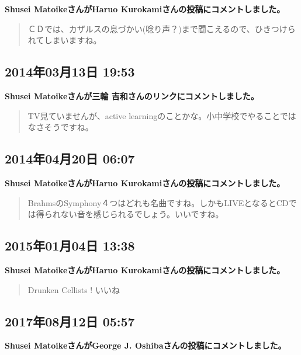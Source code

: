 \textbf{Shusei MatoikeさんがHaruo Kurokamiさんの投稿にコメントしました。}

\begin{quote}
ＣＤでは、カザルスの息づかい(唸り声？)まで聞こえるので、ひきつけられてしまいますね。
\end{quote}

\subsection*{2014年03月13日 19:53}

\textbf{Shusei Matoikeさんが三輪 吉和さんのリンクにコメントしました。}

\begin{quote}
TV見ていませんが、active learningのことかな。小中学校でやることではなさそうですね。
\end{quote}

\subsection*{2014年04月20日 06:07}

\textbf{Shusei MatoikeさんがHaruo Kurokamiさんの投稿にコメントしました。}

\begin{quote}
BrahmsのSymphony４つはどれも名曲ですね。しかもLIVEとなるとCDでは得られない音を感じられるでしょう。いいですね。
\end{quote}

\subsection*{2015年01月04日 13:38}

\textbf{Shusei MatoikeさんがHaruo Kurokamiさんの投稿にコメントしました。}

\begin{quote}
Drunken Cellists ! いいね
\end{quote}

\subsection*{2017年08月12日 05:57}

\textbf{Shusei MatoikeさんがGeorge J. Oshibaさんの投稿にコメントしました。}

